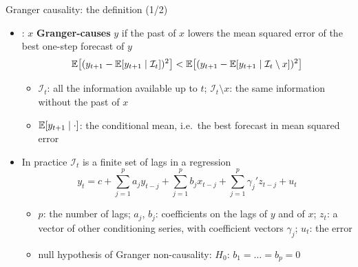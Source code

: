 \begin{frame}{Granger causality: the definition (1/2)}
\itemsize{\small}
\begin{itemize}
    \item {}: $x$ \textbf{Granger-causes} $y$ if the past of $x$ lowers the mean squared error of the best one-step forecast of $y$ \[ \mathbb{E}\big[(y_{t+1} - \mathbb{E}[y_{t+1}\mid \mathcal I_t])^2\big] < \mathbb{E}\big[(y_{t+1} - \mathbb{E}[y_{t+1}\mid \mathcal I_t\setminus x])^2\big] \]
    \begin{itemize}
        \item $\mathcal I_t$: all the information available up to $t$; $\mathcal I_t\setminus x$: the same information without the past of $x$
        \item $\mathbb{E}[y_{t+1}\mid\cdot]$: the conditional mean, i.e.\ the best forecast in mean squared error
    \end{itemize}
    \item In practice $\mathcal I_t$ is a finite set of lags in a regression \[ y_t = c + \sum_{j=1}^p a_jy_{t-j} + \sum_{j=1}^p b_jx_{t-j} + \sum_{j=1}^p \gamma_j'z_{t-j} + u_t \]
    \begin{itemize}
        \item $p$: the number of lags; $a_j$, $b_j$: coefficients on the lags of $y$ and of $x$; $z_t$: a vector of other conditioning series, with coefficient vectors $\gamma_j$; $u_t$: the error
        \item null hypothesis of Granger non-causality: $H_0$: $b_1 = \dots = b_p = 0$
    \end{itemize}
\end{itemize}
\end{frame}

